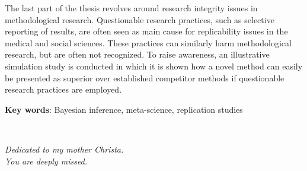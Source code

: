 The last part of the thesis revolves around research integrity issues in
methodological research. Questionable research practices, such as selective
reporting of results, are often seen as main cause for replicability issues in
the medical and social sciences. These practices can similarly harm
methodological research, but are often not recognized. To raise awareness, an
illustrative simulation study is conducted in which it is shown how a novel
method can easily be presented as superior over established competitor methods
if questionable research practices are employed.


\textbf{Key words}: Bayesian inference, meta-science, replication studies


\newpage ~

\newpage



\begin{center}
  \vspace*{5cm}

  \textit{Dedicated to my mother Christa. \\
    You are deeply missed.}
\end{center}
